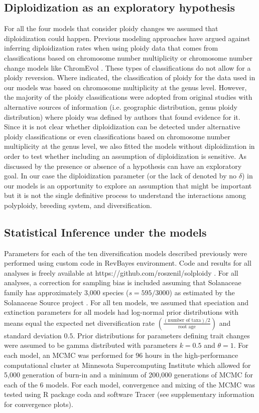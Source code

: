 \subsection{Diploidization as an exploratory hypothesis}
For all the four models that consider ploidy changes we assumed that diploidization could happen. Previous modeling approaches \citep{mayrose_2011} have argued against inferring diploidization rates when using ploidy data that comes from classifications based on chromosome number multiplicity or chromosome number change models like ChromEvol \citep{mayrose_2010}. These types of classifications do not allow for a ploidy reversion. Where indicated, the classification of ploidy for the data used in our models was based on chromosome multiplicity at the genus level. However, the majority of the ploidy classifications were adopted from original studies with alternative sources of information (i.e. geographic distribution, genus ploidy distribution) where ploidy was defined by authors that found evidence for it. Since it is not clear whether diploidization can be detected under alternative ploidy classifications or even classifications based on chromosome number multiplicity at the genus level, we also fitted the models without diploidization in order to test  whether including an assumption of diploidization is sensitive. As discussed by \citet{servedio_2014}  the presence or absence of a hypothesis can have an exploratory goal. In our case the diploidization parameter (or the lack of denoted by no $\delta$) in our models  is an opportunity to explore an assumption that might be important but it is not the single definitive process to understand the interactions among polyploidy, breeding system, and diversification.

\subsection{Statistical Inference under the models}
Parameters for each of the ten diversification models described previously were performed using custom code in RevBayes \citep{hoehna_2016} environment. Code and results for all analyses is freely available at https://github.com/roszenil/solploidy . For all analyses, a correction for sampling bias is included assuming that Solanaceae family has approximately 3,000 species ($s=595/3000$) as estimated by the Solanaceae Source project \citep{solsource}. For all ten models, we assumed that speciation and extinction parameters for all models  had log-normal prior distributions with means equal the expected net diversification rate $ ( \frac{(\textrm{number of taxa})/2}{\textrm{root age}})$ and standard deviation $0.5$.
Prior distributions for parameters defining trait changes were  assumed to be gamma distributed with parameters $k=0.5$ and $\theta=1$. 
For each model, an MCMC was performed for 96 hours in the high-performance computational cluster at Minnesota Supercomputing Institute which allowed for 5,000 generation of burn-in and a minimum of 200,000 generations of MCMC for each of the 6 models. For each model, convergence and mixing of the MCMC was tested using R package coda and software Tracer (see supplementary information for convergence plots).


